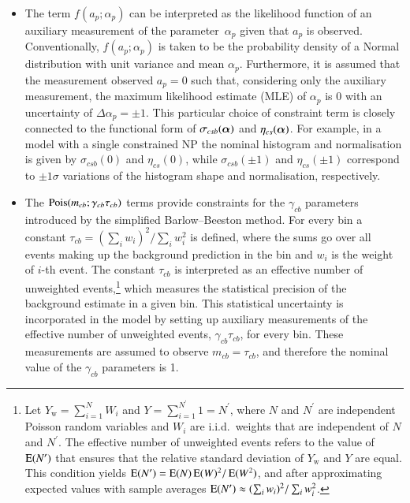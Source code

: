 \begin{itemize}

\item The term $f(a_p; \alpha_p)$ can be interpreted as the likelihood function
  of an auxiliary measurement of the parameter~$\alpha_p$ given that $a_p$ is
  observed. Conventionally, $f(a_p; \alpha_p)$ is taken to be the probability
  density of a Normal distribution with unit variance and mean
  $\alpha_p$. Furthermore, it is assumed that the measurement observed $a_p = 0$
  such that, considering only the auxiliary measurement, the maximum likelihood
  estimate (MLE) of $\alpha_p$ is 0 with an uncertainty of
  $\Delta \alpha_p = \pm 1$. This particular choice of constraint term is
  closely connected to the functional form of $\sigma_{csb}(\bm{\alpha})$ and
  $\eta_{cs}(\bm{\alpha})$. For example, in a model with a single constrained
  NP the nominal histogram and normalisation is given by $\sigma_{csb}(0)$ and
  $\eta_{cs}(0)$, while $\sigma_{csb}(\pm 1)$ and $\eta_{cs}(\pm 1)$ correspond
  to $\pm 1 \sigma$ variations of the histogram shape and normalisation,
  respectively.


\item The $\operatorname{Pois}(m_{cb}; \gamma_{cb} \tau_{cb})$ terms provide constraints for
  the $\gamma_{cb}$ parameters introduced by the simplified Barlow--Beeston
  method. For every bin a constant
  $ \tau_{cb} = ( \sum_i w_i )^2 / \sum_i w_i^2 $ is defined, where the sums go
  over all events making up the background prediction in the bin and $w_i$ is
  the weight of $i$-th event. The constant $\tau_{cb}$ is interpreted as an
  effective number of unweighted events,\footnote{Let
    $Y_{\text{w}} = \sum_{i = 1}^{N} W_i$ and
    $Y = \sum_{i = 1}^{N^\prime} 1 = N^\prime$, where $N$ and $N^\prime$ are
    independent Poisson random variables and $W_i$ are i.i.d.\ weights that are
    independent of $N$ and $N^\prime$. The effective number of unweighted events
    refers to the value of $\operatorname{E}(N^\prime)$ that ensures that the relative
    standard deviation of $Y_{\text{w}}$ and $Y$ are equal. This condition
    yields $\operatorname{E}(N^\prime) = \operatorname{E}(N) \operatorname{E}(W)^2 / \operatorname{E}(W^2)$, and
    after approximating expected values with sample averages
    $\operatorname{E}(N^\prime) \approx ( \sum_i w_i )^2 / \sum_i w_i^2$.} which measures
  the statistical precision of the background estimate in a given
  bin. This  statistical uncertainty is incorporated in the model
  by setting up auxiliary measurements of the effective number of unweighted
  events, $\gamma_{cb}\tau_{cb}$, for every bin. These measurements are assumed
  to observe $m_{cb} = \tau_{cb}$, and therefore the nominal value of the
  $\gamma_{cb}$ parameters is 1.
\end{itemize}
%
%

